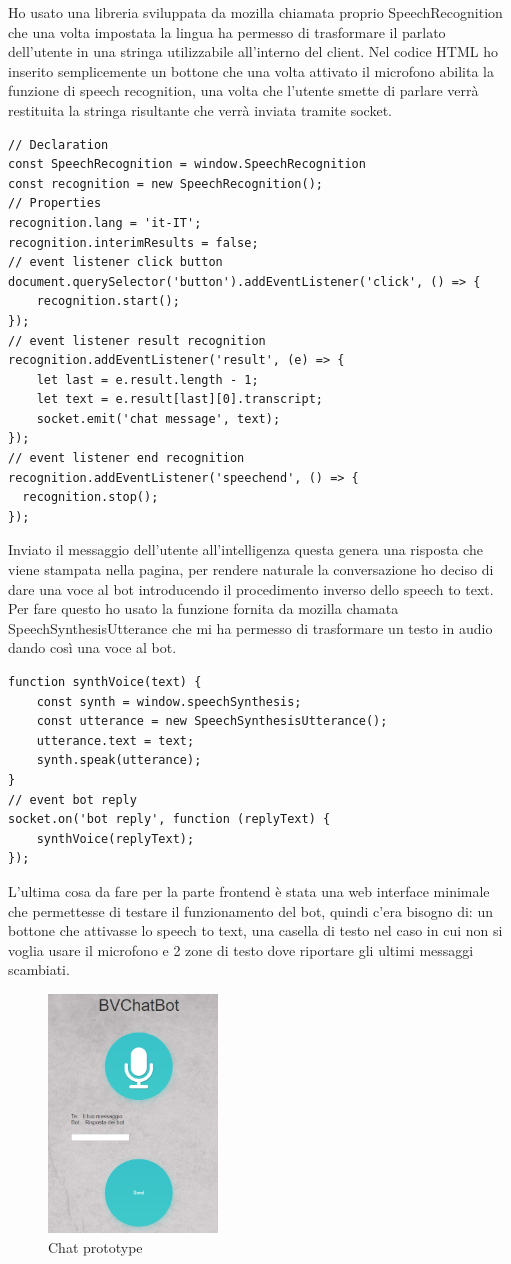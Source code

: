 Ho usato una libreria sviluppata da mozilla chiamata proprio SpeechRecognition che una volta impostata la lingua ha permesso di trasformare il parlato dell'utente in una stringa utilizzabile all'interno del client.
Nel codice HTML ho inserito semplicemente un bottone che una volta attivato il microfono abilita la funzione di speech recognition, una volta che l'utente smette di parlare verrà restituita la stringa risultante che verrà inviata tramite socket.
\begin{lstlisting}
// Declaration
const SpeechRecognition = window.SpeechRecognition
const recognition = new SpeechRecognition();
// Properties
recognition.lang = 'it-IT';
recognition.interimResults = false;
// event listener click button
document.querySelector('button').addEventListener('click', () => {
    recognition.start();
});
// event listener result recognition
recognition.addEventListener('result', (e) => {
    let last = e.result.length - 1;
    let text = e.result[last][0].transcript;
    socket.emit('chat message', text);
});
// event listener end recognition
recognition.addEventListener('speechend', () => {
  recognition.stop();
});
\end{lstlisting}
Inviato il messaggio dell'utente all'intelligenza questa genera una risposta che viene stampata nella pagina, per rendere naturale la conversazione ho deciso di dare una voce al bot introducendo il procedimento inverso dello speech to text. Per fare questo ho usato la funzione fornita da mozilla chamata SpeechSynthesisUtterance che mi ha permesso di trasformare un testo in audio dando così una voce al bot.
\begin{lstlisting}
function synthVoice(text) {
    const synth = window.speechSynthesis;
    const utterance = new SpeechSynthesisUtterance();
    utterance.text = text;
    synth.speak(utterance);
}
// event bot reply
socket.on('bot reply', function (replyText) {
    synthVoice(replyText);
});
\end{lstlisting}
L'ultima cosa da fare per la parte frontend è stata una web interface minimale che permettesse di testare il funzionamento del bot, quindi c'era bisogno di: un bottone che attivasse lo speech to text, una casella di testo nel caso in cui non si voglia usare il microfono e 2 zone di testo dove riportare gli ultimi messaggi scambiati.
\begin{figure}[H]
 \centering
  \includegraphics[width=0.4\textwidth]{img/prototype.png}
 \caption{Chat prototype}
\end{figure}
